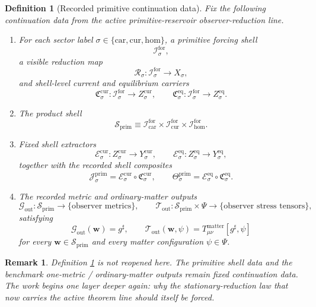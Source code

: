 \documentclass[11pt]{article}
\newcommand{\CompletedMetric}{g^{\sharp}}
\newcommand{\Car}{\mathrm{car}}
\newcommand{\Cur}{\mathrm{cur}}
\newcommand{\Hom}{\mathrm{hom}}
\newcommand{\ForSpace}[1]{\mathcal I_{#1}^{\mathrm{for}}}
\newcommand{\PrimShell}{\mathcal S_{\mathrm{prim}}}
\newcommand{\Reduction}[1]{\mathcal R_{#1}}
\newcommand{\CurrentCarrier}[1]{\mathfrak C_{#1}^{\mathrm{cur}}}
\newcommand{\EqCarrier}[1]{\mathfrak C_{#1}^{\mathrm{eq}}}
\newcommand{\CurrentExtract}[1]{\mathscr E_{#1}^{\mathrm{cur}}}
\newcommand{\EqExtract}[1]{\mathscr E_{#1}^{\mathrm{eq}}}
\newcommand{\PrimCurrent}[1]{\mathcal J_{#1}^{\mathrm{prim}}}
\newcommand{\PrimTheta}[1]{\Theta_{#1}^{\mathrm{prim}}}
\newcommand{\MetricOut}{\mathscr G_{\mathrm{out}}}
\newcommand{\MatterOut}{\mathscr T_{\mathrm{out}}}
\newtheorem{definition}{Definition}
\newtheorem{remark}{Remark}
\begin{document}
\begin{definition}[Recorded primitive continuation data]
\label{def:fixed}
Fix the following continuation data from the active primitive-reservoir observer-reduction line.
\begin{enumerate}
    \item For each sector label \(\sigma\in\{\Car,\Cur,\Hom\}\), a primitive forcing shell
    \[
    \ForSpace{\sigma},
    \]
    a visible reduction map
    \[
    \Reduction{\sigma}:\ForSpace{\sigma}\to X_{\sigma},
    \]
    and shell-level current and equilibrium carriers
    \[
    \CurrentCarrier{\sigma}:\ForSpace{\sigma}\to Z_{\sigma}^{\mathrm{cur}},
    \qquad
    \EqCarrier{\sigma}:\ForSpace{\sigma}\to Z_{\sigma}^{\mathrm{eq}}.
    \]
    \item The product shell
    \[
    \PrimShell
    \equiv
    \ForSpace{\Car}\times \ForSpace{\Cur}\times \ForSpace{\Hom}.
    \]
    \item Fixed shell extractors
    \[
    \CurrentExtract{\sigma}:Z_{\sigma}^{\mathrm{cur}}\to Y_{\sigma}^{\mathrm{cur}},
    \qquad
    \EqExtract{\sigma}:Z_{\sigma}^{\mathrm{eq}}\to Y_{\sigma}^{\mathrm{eq}},
    \]
    together with the recorded shell composites
    \begin{equation}
    \PrimCurrent{\sigma}
    =
    \CurrentExtract{\sigma}\circ \CurrentCarrier{\sigma},
    \qquad
    \PrimTheta{\sigma}
    =
    \EqExtract{\sigma}\circ \EqCarrier{\sigma}.
    \label{eq:primcomposites}
    \end{equation}
    \item The recorded metric and ordinary-matter outputs
    \[
    \MetricOut:\PrimShell\to\{\text{observer metrics}\},
    \qquad
    \MatterOut:\PrimShell\times\Psi\to\{\text{observer stress tensors}\},
    \]
    satisfying
    \begin{equation}
    \MetricOut(\mathbf w)=\CompletedMetric,
    \qquad
    \MatterOut(\mathbf w,\psi)
    =
    T_{\mu\nu}^{\mathrm{matter}}[\CompletedMetric,\psi]
    \label{eq:fixedoutputs}
    \end{equation}
    for every \(\mathbf w\in\PrimShell\) and every matter configuration \(\psi\in\Psi\).
\end{enumerate}
\end{definition}

\begin{remark}
Definition \ref{def:fixed} is not reopened here. The primitive shell data and the benchmark one-metric / ordinary-matter outputs remain fixed continuation data. The work begins one layer deeper again: why the stationary-reduction law that now carries the active theorem line should itself be forced.
\end{remark}
\end{document}
